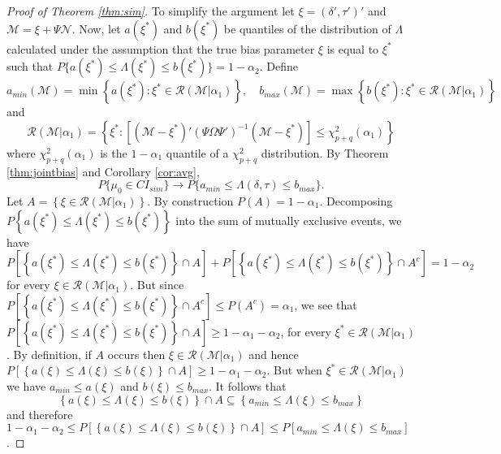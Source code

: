 \begin{proof}[Proof of Theorem \ref{thm:sim}]
To simplify the argument let $\xi = (\delta', \tau')'$ and $\mathscr{M} = \xi + \Psi \mathscr{N}$.
Now, let $a(\xi^*)$ and  $b(\xi^*)$ be quantiles of the distribution of $\Lambda$ calculated under the assumption that the true bias parameter $\xi$ is equal to $\xi^*$ such that $P\{a(\xi^*) \leq \Lambda(\xi^*)\leq b(\xi^*)\} = 1-\alpha_2$.
Define
\[
  a_{min}(\mathscr{M}) = \min\left\{a(\xi^*) \colon \xi^* \in \mathscr{R}(\mathscr{M}|\alpha_1)  \right\}, \quad
  b_{max}(\mathscr{M}) = \max\left\{b(\xi^*) \colon \xi^* \in \mathscr{R}(\mathscr{M}|\alpha_1)  \right\}
\]
and
\[
  \mathscr{R}(\mathscr{M}|\alpha_1) = \left\{ \xi^* \colon \left[\left(\mathscr{M} - \xi^*\right)' \left( \Psi \Omega \Psi' \right)^{-1}\left( \mathscr{M} - \xi^* \right)\right] \leq \chi^2_{p+q}(\alpha_1) \right\}
\]
where $\chi_{p+q}^2(\alpha_1)$ is the $1-\alpha_1$ quantile of a $\chi_{p+q}^2$ distribution. 
By Theorem \ref{thm:jointbias} and Corollary \ref{cor:avg}, 
\[
P\{ \mu_0 \in CI_{sim}\} \rightarrow P\{ a_{min} \leq \Lambda(\delta, \tau) \leq b_{max}\}.
\]
Let $A = \left \{\xi \in \mathscr{R}(\mathscr{M}|\alpha_1) \right\}$.
By construction $P(A) = 1 - \alpha_1$.
Decomposing $P\left\{ a(\xi^*) \leq \Lambda(\xi^*) \leq b(\xi^*)  \right\}$ into the sum of mutually exclusive events, we have
\[
P\left[\left\{ a(\xi^*) \leq \Lambda(\xi^*) \leq b(\xi^*)  \right\} \cap A \right] + P\left[\left\{ a(\xi^*) \leq \Lambda(\xi^*) \leq b(\xi^*)  \right\} \cap A^c \right] = 1-\alpha_2
\]
for every $\xi \in \mathscr{R}(\mathcal{M}|\alpha_1)$.
But since 
$P\left[\left\{ a(\xi^*) \leq \Lambda(\xi^*) \leq b(\xi^*)  \right\} \cap A^c \right] \leq P(A^c) = \alpha_1$,
we see that
$P\left[\left\{ a(\xi^*) \leq \Lambda(\xi^*) \leq b(\xi^*)  \right\} \cap A \right] \geq 1- \alpha_1 - \alpha_2$,
for every $\xi^* \in \mathscr{R}(\mathscr{M}|\alpha_1)$.
By definition, if $A$ occurs then $\xi \in \mathscr{R}(\mathscr{M}|\alpha_1)$ and hence 
$P\left[\left\{ a(\xi) \leq \Lambda(\xi) \leq b(\xi)  \right\} \cap A \right] \geq 1- \alpha_1 - \alpha_2$.
But when $\xi^* \in  \mathscr{R}(\mathscr{M}|\alpha_1)$ we have
$a_{min} \leq a(\xi)$ and $b(\xi) \leq b_{max}$. It follows that 
\[
\left \{ a(\xi) \leq \Lambda (\xi) \leq b(\xi) \right \} \cap A \subseteq \left\{ a_{min} \leq \Lambda (\xi) \leq b_{max}\right \}
\]
and therefore
$1-\alpha_1 - \alpha_2 \leq P\left[\left \{ a(\xi) \leq \Lambda (\xi) \leq b(\xi) \right \} \cap A  \right]
\leq P\left[ a_{min} \leq \Lambda(\xi) \leq b_{max} \right]$.
\end{proof}


